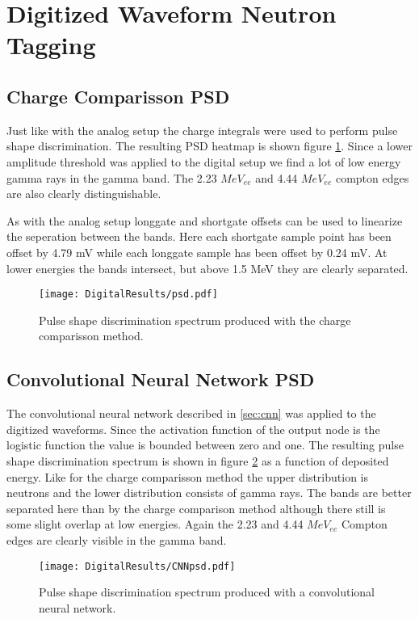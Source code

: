 \documentclass[main.tex]{subfiles}
\begin{document}
\section{Digitized Waveform Neutron Tagging}

\subsection{Charge Comparisson PSD}
Just like with the analog setup the charge integrals were used to perform pulse shape discrimination. The resulting PSD heatmap is shown figure \ref{fig:psd_d}. Since a lower amplitude threshold was applied to the digital setup we find a lot of low energy gamma rays in the gamma band. The 2.23 $MeV_{ee}$ and 4.44 $MeV_{ee}$ compton edges are also clearly distinguishable. 

As with the analog setup longgate and shortgate offsets can be used to linearize the seperation between the bands. Here each shortgate sample point has been offset by 4.79 mV while each longgate sample has been offset by 0.24 mV. At lower energies the bands intersect, but above 1.5 MeV they are clearly separated.

\begin{figure}[ht]
    \centering
        \texttt{[image: DigitalResults/psd.pdf]}
        \caption{Pulse shape discrimination spectrum produced with the charge comparisson method.}
        \label{fig:psd_d}
\end{figure}

\subsection{Convolutional Neural Network PSD}
The convolutional neural network described in \ref{sec:cnn} was applied to the digitized waveforms. Since the activation function of the output node is the logistic function the value is bounded between zero and one. The resulting pulse shape discrimination spectrum is shown in figure \ref{fig:cnn_E} as a function of deposited energy. Like for the charge comparisson method the upper distribution is neutrons and the lower distribution consists of gamma rays. The bands are better separated here than by the charge comparison method although there still is some slight overlap at low energies. Again the 2.23 and 4.44 $MeV_{ee}$ Compton edges are clearly visible in the gamma band. 

\begin{figure}[ht]
    \centering
        \texttt{[image: DigitalResults/CNNpsd.pdf]}
        \caption{Pulse shape discrimination spectrum produced with a convolutional neural network.}
    \label{fig:cnn_E} 
\end{figure}
\end{document}
